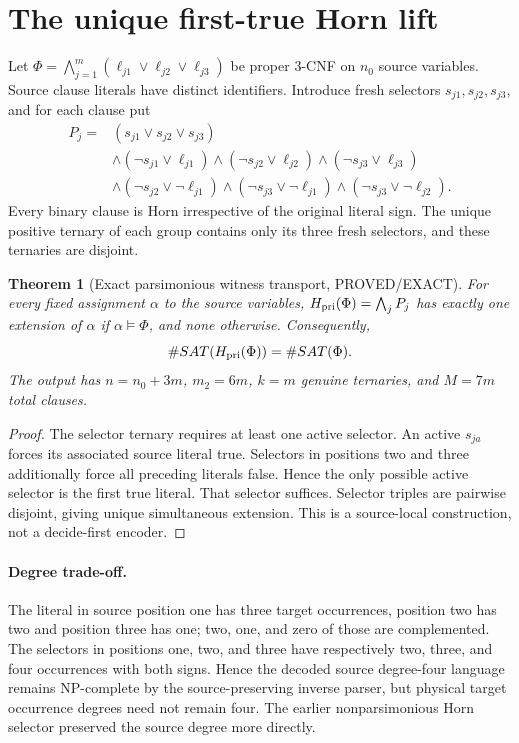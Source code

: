 \documentclass[11pt]{article}
\newtheorem{theorem}{Theorem}
\begin{document}
\section{The unique first-true Horn lift}
Let $\Phi=\bigwedge_{j=1}^{m}(\ell_{j1}\vee\ell_{j2}\vee\ell_{j3})$ be proper 3-CNF on $n_0$ source variables. Source clause literals have distinct identifiers. Introduce fresh selectors $s_{j1},s_{j2},s_{j3}$, and for each clause put
\[
\begin{split}
P_j={}&(s_{j1}\vee s_{j2}\vee s_{j3})\\
&\wedge(\neg s_{j1}\vee\ell_{j1})
\wedge(\neg s_{j2}\vee\ell_{j2})
\wedge(\neg s_{j3}\vee\ell_{j3})\\
&\wedge(\neg s_{j2}\vee\neg\ell_{j1})
\wedge(\neg s_{j3}\vee\neg\ell_{j1})
\wedge(\neg s_{j3}\vee\neg\ell_{j2}).
\end{split} \tag{1}
\]
Every binary clause is Horn irrespective of the original literal sign. The unique positive ternary of each group contains only its three fresh selectors, and these ternaries are disjoint.
\begin{theorem}[Exact parsimonious witness transport, PROVED/EXACT]
For every fixed assignment $\alpha$ to the source variables, $H_{\rm pri}(\Phi)=\bigwedge_jP_j$ has exactly one extension of $\alpha$ if $\alpha\models\Phi$, and none otherwise. Consequently,
\[
\#SAT(H_{\rm pri}(\Phi))=\#SAT(\Phi).
\]
The output has $n=n_0+3m$, $m_2=6m$, $k=m$ genuine ternaries, and $M=7m$ total clauses.
\end{theorem}
\begin{proof}
The selector ternary requires at least one active selector. An active $s_{ja}$ forces its associated source literal true. Selectors in positions two and three additionally force all preceding literals false. Hence the only possible active selector is the first true literal. That selector suffices. Selector triples are pairwise disjoint, giving unique simultaneous extension. This is a source-local construction, not a decide-first encoder.
\end{proof}
\paragraph{Degree trade-off.} The literal in source position one has three target occurrences, position two has two and position three has one; two, one, and zero of those are complemented. The selectors in positions one, two, and three have respectively two, three, and four occurrences with both signs. Hence the decoded source degree-four language remains NP-complete by the source-preserving inverse parser, but physical target occurrence degrees need not remain four. The earlier nonparsimonious Horn selector preserved the source degree more directly.
\end{document}

